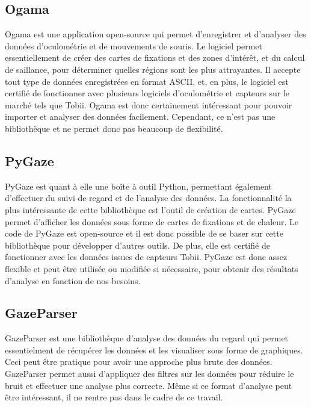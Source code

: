 \documentclass[hidelinks,12pt]{article}
\begin{document}
\subsection{Ogama}

Ogama \cite{ogama} est une application open-source qui permet d'enregistrer et
d'analyser des données d'oculométrie et de mouvements de souris. Le logiciel
permet essentiellement de créer des cartes de fixations et des zones d'intérêt,
et du calcul de saillance, pour déterminer quelles régions sont les plus
attrayantes. Il accepte tout type de données enregistrées en format ASCII, et,
en plus, le logiciel est certifié de fonctionner avec plusieurs logiciels
d'oculométrie et capteurs sur le marché tels que Tobii. Ogama est donc
certainement intéressant pour pouvoir importer et analyser des données
facilement. Cependant, ce n'est pas une bibliothèque et ne permet donc pas
beaucoup de flexibilité.

\subsection{PyGaze}

PyGaze \cite{pygaze} est quant à elle une boîte à outil Python, permettant
également d'effectuer du suivi de regard et de l'analyse des données. La
fonctionnalité la plus intéressante de cette bibliothèque est l'outil
de création de cartes. PyGaze permet d'afficher les données sous forme de
cartes de fixations et de chaleur. Le code de PyGaze est open-source et il est
donc possible de se baser sur cette bibliothèque pour développer d'autres
outils. De plus, elle est certifié de fonctionner avec les données issues de
capteurs Tobii. PyGaze est donc assez flexible et peut être utilisée ou
modifiée si nécessaire, pour obtenir des résultats d'analyse en fonction de nos
besoins.

\subsection{GazeParser}

GazeParser \cite{gazeparser} est une bibliothèque d'analyse des données du
regard qui permet essentielment de récupérer les données et les visualiser sous
forme de graphiques. Ceci peut être pratique pour avoir une approche plus brute
des données. GazeParser permet aussi d'appliquer des filtres sur les données
pour réduire le bruit et effectuer une analyse plus correcte. Même si ce format
d'analyse peut être intéressant, il ne rentre pas dans le cadre de ce travail.
\end{document}
